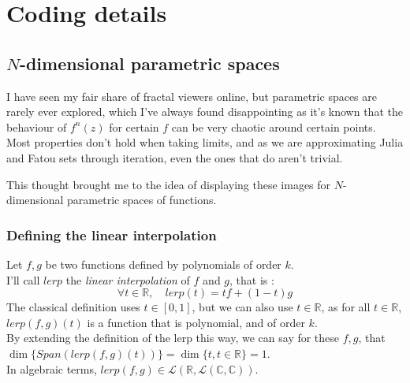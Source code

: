 \documentclass{article}
\newcommand\R{\mathbb{R}}
\newcommand\C{\mathbb{C}}
\begin{document}
\section{Coding details}

\subsection{$N$-dimensional parametric spaces}

I have seen my fair share of fractal viewers online, but parametric spaces are rarely ever explored, which I've always found disappointing as it's known that the behaviour of $f^n(z)$ for certain $f$ can be very chaotic around certain points. \\
Most properties don't hold when taking limits, and as we are approximating Julia and Fatou sets through iteration, even the ones that do aren't trivial. \\
\vspace{5mm}

This thought brought me to the idea of displaying these images for $N$-dimensional parametric spaces of functions. \\
\vspace{5mm}

\subsubsection{Defining the linear interpolation}

Let $f, g$ be two functions defined by polynomials of order $k$. \\
I'll call $lerp$ the \textit{linear interpolation} of $f$ and $g$, that is : \\
\begin{equation}
\forall t \in \R, \quad lerp(t) = tf + (1-t)g
\end{equation}
The classical definition uses $t \in [0,1]$, but we can also use $t \in \R$, as for all $t \in \R$, $lerp(f,g)(t)$ is a function that is polynomial, and of order $k$. \\
\vspace{5mm}
By extending the definition of the lerp this way, we can say for these $f,g$, that $\dim \lbrace Span(lerp(f,g)(t)) \rbrace = \dim \lbrace t, t \in \R \rbrace = 1$. \\
In algebraic terms, $lerp(f,g) \in \mathcal{L}(\R, \mathcal{L}(\C, \C))$. \\
\vspace{5mm}
\end{document}
